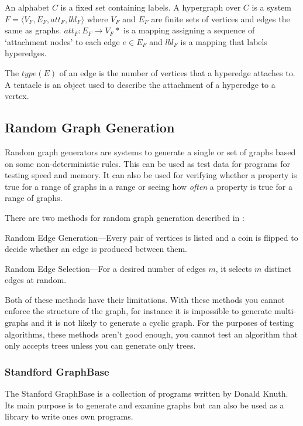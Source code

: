 \documentclass{article}
\begin{document}
  An alphabet $C$ is a fixed set containing labels. A hypergraph over $C$ is a system $F = \langle V_F, E_F, att_F, lbl_F \rangle$ where $V_F$ and $E_F$ are finite sets of vertices and edges the same as graphs. $att_F : E_F \to V_F*$ is a mapping assigning a sequence of `attachment nodes' to each edge $e \in E_F$ and $lbl_F$ is a mapping that labels hyperedges. 

  The $type(E)$ of an edge is the number of vertices that a hyperedge attaches to. A tentacle is an object used to describe the attachment of a hyperedge to a vertex.


  

\subsection{Random Graph Generation}
  Random graph generators are systems to generate a single or set of graphs based on some non-deterministic rules. This can be used as test data for programs for testing speed and memory. It can also be used for verifying whether a property is true for a range of graphs in a range or seeing how \emph{often} a property is true for a range of graphs.

  There are two methods for random graph generation described in \cite{Skiena}:

  Random Edge Generation---Every pair of vertices is listed and a coin is flipped to decide whether an edge is produced between them.

  Random Edge Selection---For a desired number of edges $m$, it selects $m$ distinct edges at random.

  Both of these methods have their limitations. With these methods you cannot enforce the structure of the graph, for instance it is impossible to generate multi-graphs and it is not likely to generate a cyclic graph. For the purposes of testing algorithms, these methods aren't good enough, you cannot test an algorithm that only accepts trees unless you can generate only trees.

  \subsubsection{Standford GraphBase}
    The Stanford GraphBase is a collection of programs written by Donald Knuth. Its main purpose is to generate and examine graphs but can also be used as a library to write ones own programs. 
\end{document}
